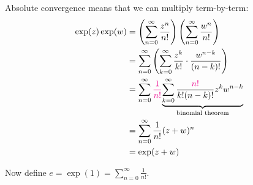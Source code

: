 \documentclass[12pt]{article}
\begin{document}
Absolute convergence means that we can multiply term-by-term:
\begin{align*}
    \exp(z)\exp(w) & = \left(\sum_{n=0}^{\infty}\frac{z^n}{n!}\right)\left(\sum_{n=0}^{\infty}\frac{w^n}{n!}\right)\\
    &= \sum_{n=0}^{\infty}\left(\sum_{k=0}^{\infty}\frac{z^k}{k!}\cdot\frac{w^{n-k}}{(n-k)!}\right)\\
    &= \sum_{n=0}^{\infty}\textcolor{magenta}{\frac{1}{n!}}\underset{\text{binomial theorem}}{\underbrace{\sum_{k=0}^{\infty}\frac{\textcolor{magenta}{n!}}{k!(n-k)!}z^kw^{n-k}}}\\
    &= \sum_{n=0}^{\infty}{\frac{1}{n!}}(z+w)^n\\
    &= \exp(z+w)
\end{align*}

Now define $e=\exp(1)=\sum_{n=0}^{\infty}\frac{1}{n!}$.
\end{document}

